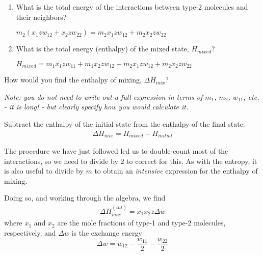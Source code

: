 \begin{activity}
\begin{ctqs}
\begin{enumerate}
			\item What is the total energy of the interactions between type-2 molecules and their neighbors?
			
				\begin{solution}[1.25in]
					$m_2(x_1 z w_{12} + x_2 z w_{22}) = m_2 x_1 z w_{12} + m_2 x_2 z w_{22}$
				\end{solution}
				
			\item What is the total energy (enthalpy) of the mixed state, $H_{mixed}$?
			
				\begin{solution}[1.25in]
				
					$H_{mixed} = m_1 x_1 z w_{11} + m_1 x_2 z w_{12} + m_2 x_1 z w_{12} + m_2 x_2 z w_{22}$
				
				\end{solution}
				
		\end{enumerate}
		
	\question How would you find the enthalpy of mixing, $\Delta H_{mix}$?
	
		\emph{Note: you do not need to write out a full expression in terms of $m_1$, $m_2$, $w_{11}$, etc. - it is long! - but clearly specify how you would calculate it.}
	
		\begin{solution}[1.25in]
		
			Subtract the enthalpy of the initial state from the enthalpy of the final state:
			\begin{align*}
				\Delta H_{mix} = H_{mixed} - H_{initial}
			\end{align*}
		
		\end{solution}
		
\end{ctqs}

\begin{infobox}
The procedure we have just followed led us to double-count most of the interactions, so we need to divide by 2 to correct for this.  As with the entropy, it is also useful to divide by $m$ to obtain an \emph{intensive} expression for the enthalpy of mixing.
	
		Doing so, and working through the algebra, we find
		\begin{align*}
			\Delta H_{mix}^{(int)} %
					= x_1 x_2 z \Delta w
		\end{align*}
		where $x_1$ and $x_2$ are the mole fractions of type-1 and type-2 molecules, respectively, and $\Delta w$ is the exchange energy
		\begin{equation*}
			\Delta w = w_{12} - \frac{w_{11}}{2} - \frac{w_{22}}{2}
		\end{equation*}
\end{infobox}


\end{activity}
